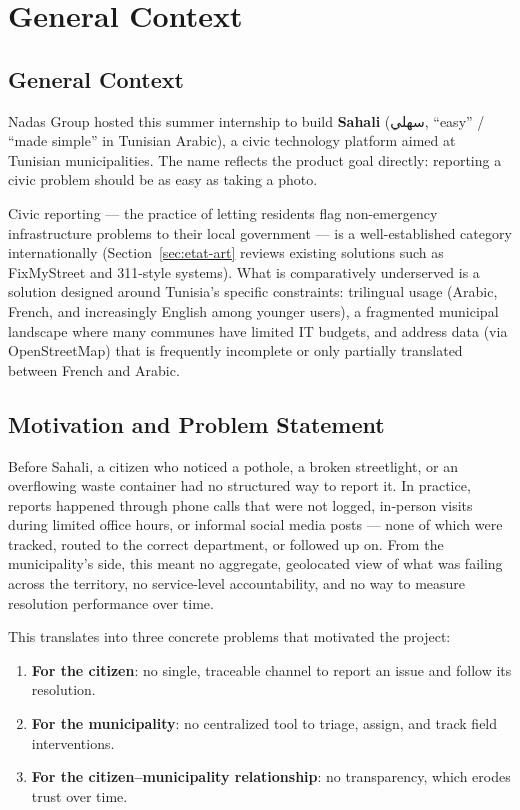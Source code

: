 \chapter{General Context}
\label{chap:cadre-general}

\section{General Context}

Nadas Group hosted this summer internship to build \textbf{Sahali} (\textarabic{سهلي}, ``easy'' / ``made simple'' in Tunisian Arabic), a civic technology platform aimed at Tunisian municipalities. The name reflects the product goal directly: reporting a civic problem should be as easy as taking a photo.

Civic reporting --- the practice of letting residents flag non-emergency infrastructure problems to their local government --- is a well-established category internationally (Section~\ref{sec:etat-art} reviews existing solutions such as FixMyStreet and 311-style systems). What is comparatively underserved is a solution designed around Tunisia's specific constraints: trilingual usage (Arabic, French, and increasingly English among younger users), a fragmented municipal landscape where many communes have limited IT budgets, and address data (via OpenStreetMap) that is frequently incomplete or only partially translated between French and Arabic.

\section{Motivation and Problem Statement}

Before Sahali, a citizen who noticed a pothole, a broken streetlight, or an overflowing waste container had no structured way to report it. In practice, reports happened through phone calls that were not logged, in-person visits during limited office hours, or informal social media posts --- none of which were tracked, routed to the correct department, or followed up on. From the municipality's side, this meant no aggregate, geolocated view of what was failing across the territory, no service-level accountability, and no way to measure resolution performance over time.

This translates into three concrete problems that motivated the project:

\begin{enumerate}[leftmargin=*]
  \item \textbf{For the citizen}: no single, traceable channel to report an issue and follow its resolution.
  \item \textbf{For the municipality}: no centralized tool to triage, assign, and track field interventions.
  \item \textbf{For the citizen--municipality relationship}: no transparency, which erodes trust over time.
\end{enumerate}

